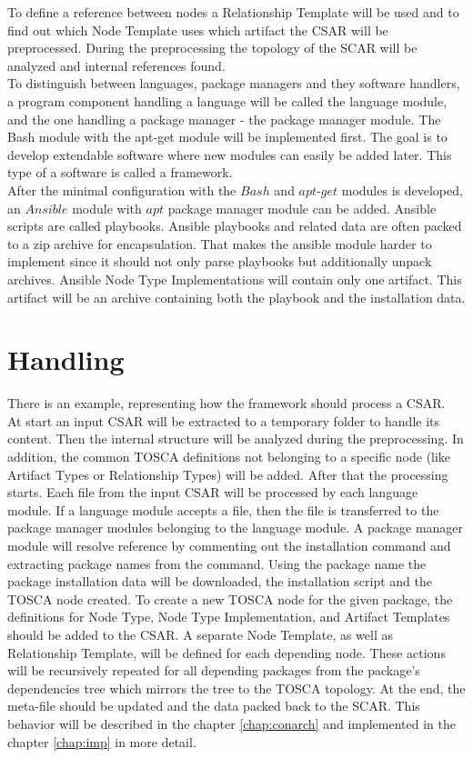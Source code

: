 To define a reference between nodes a Relationship Template will be used and to find out which Node Template uses which artifact the CSAR will be preprocessed.
During the preprocessing the topology of the SCAR will be analyzed and internal references found.\\
To distinguish between languages, package managers and they software handlers, a program component handling a language will be called the language module, and the one handling a package manager - the package manager module.
The Bash module with the apt-get module will be implemented first. 
The goal is to develop extendable software where new modules can easily be added later.
This type of a software is called a framework.\\
After the minimal configuration with the $Bash$ and $apt$-$get$ modules is developed, an $Ansible$ module with $apt$ package manager module can be added. 
Ansible scripts are called playbooks. 
Ansible playbooks and related data are often packed to a zip archive for encapsulation.
That makes the ansible module harder to implement since it should not only parse playbooks but additionally unpack archives. Ansible Node Type Implementations will contain only one artifact.
This artifact will be an archive containing both the playbook and the installation data.

\section*{Handling}
There is an example, representing how the framework should process a CSAR.\\
At start an input CSAR will be extracted to a temporary folder to handle its content.
Then the internal structure will be analyzed during the preprocessing. 
In addition, the common TOSCA definitions not belonging to a specific node (like Artifact Types or Relationship Types) will be added. 
After that the processing starts. 
Each file from the input CSAR will be processed by each language module.
If a language module accepts a file, then the file is transferred to the package manager modules belonging to the language module.
A package manager module will resolve reference by commenting out the installation command and extracting package names from the command.
Using the package name the package installation data will be downloaded, the installation script and the TOSCA node created. 
To create a new TOSCA node for the given package, the definitions for Node Type, Node Type Implementation, and Artifact Templates should be added to the CSAR. 
A separate Node Template, as well as Relationship Template, will be defined for each depending node.
These actions will be recursively repeated for all depending packages from the package's dependencies tree which mirrors the tree to the TOSCA topology.
At the end, the meta-file should be updated and the data packed back to the SCAR. %
This behavior will be described in the chapter \ref{chap:conarch} and implemented in the chapter \ref{chap:imp} in more detail.

